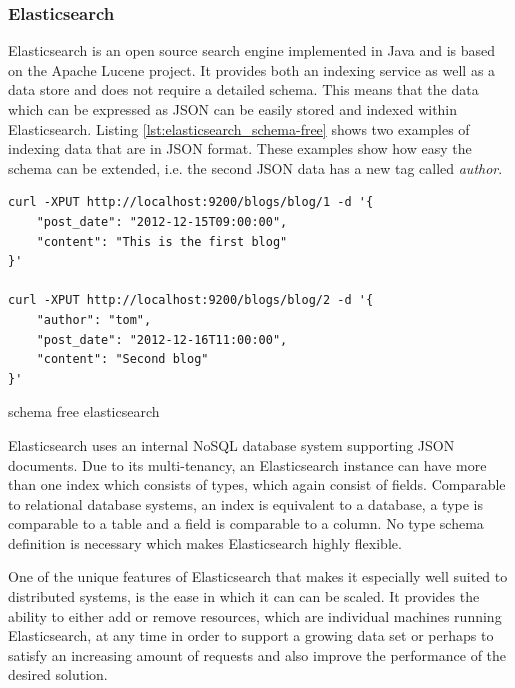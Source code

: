 \subsubsection{Elasticsearch \label{sec:back_se_es}}

Elasticsearch is an open source search engine implemented in Java and is based on the Apache Lucene project. It provides both an indexing service as well as a data store and does not require a detailed schema. This means that the data which can be expressed as \ac{JSON} can be easily stored and indexed within Elasticsearch. Listing \ref{lst:elasticsearch_schema-free} shows two examples of indexing data that are in \ac{JSON} format. These examples show how easy the schema can be extended, i.e. the second \ac{JSON} data has a new tag called \textit{author}.
 
\begin{code}
\begin{verbatim}
curl -XPUT http://localhost:9200/blogs/blog/1 -d '{
    "post_date": "2012-12-15T09:00:00",
    "content": "This is the first blog"
}'

curl -XPUT http://localhost:9200/blogs/blog/2 -d '{
    "author": "tom",
    "post_date": "2012-12-16T11:00:00",
    "content": "Second blog"
}'
\end{verbatim}
\caption{schema free elasticsearch}
\label{lst:elasticsearch_schema-free}
\end{code}


Elasticsearch uses an internal \ac{NoSQL} database system supporting \ac{JSON} documents. Due to its multi-tenancy, an Elasticsearch instance can have more than one index which consists of types, which again consist of fields. Comparable to relational database systems, an index is equivalent to a database, a type is comparable to a table and a field is comparable to a column. No type schema definition is necessary which makes Elasticsearch highly flexible.

One of the unique features of Elasticsearch that makes it especially well suited to distributed systems, is the ease in which it can  can be scaled. It provides the ability to either add or remove resources, which are individual machines running Elasticsearch, at any time in order to support a growing data set or perhaps to satisfy an increasing amount of requests and also improve the performance of the desired solution.

